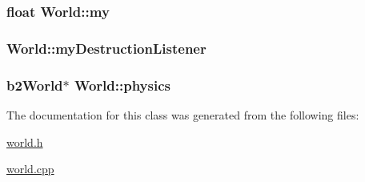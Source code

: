 \subsubsection[{my}]{\setlength{\rightskip}{0pt plus 5cm}float World\+::my\hspace{0.3cm}{\ttfamily [protected]}}\label{classWorld_a3ef0e1ad2396eab18e18684f11d91529}
\hypertarget{classWorld_a9fe52553a01225766d31480cc99b79ef}{}
\subsubsection[{my\+Destruction\+Listener}]{ World\+::my\+Destruction\+Listener\hspace{0.3cm}{\ttfamily [static]}}\label{classWorld_a9fe52553a01225766d31480cc99b79ef}
\hypertarget{classWorld_a99f3098ee94a83726a1ea67ea515417f}{}
\subsubsection[{physics}]{\setlength{\rightskip}{0pt plus 5cm}b2\+World$\ast$ World\+::physics\hspace{0.3cm}{\ttfamily [protected]}}\label{classWorld_a99f3098ee94a83726a1ea67ea515417f}


The documentation for this class was generated from the following files\+:\begin{DoxyCompactItemize}
\item 
\hyperlink{world_8h}{world.\+h}\item 
\hyperlink{world_8cpp}{world.\+cpp}\end{DoxyCompactItemize}
